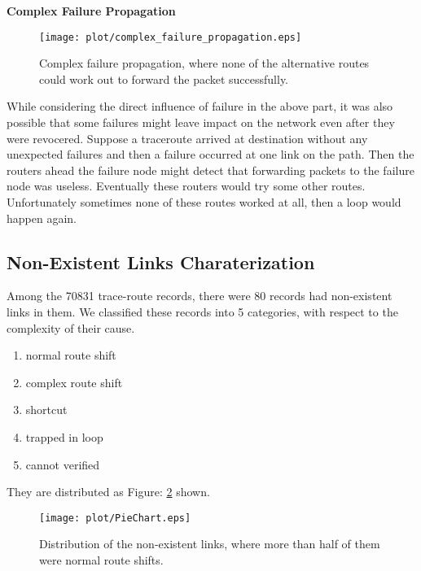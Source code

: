 \documentclass[conference, twocolumn, oneside, 10pt]{IEEEtran}
\begin{document}
\textbf{Complex Failure Propagation}

\begin{figure}[h!]
\centering
\texttt{[image: plot/complex\_failure\_propagation.eps]}
\caption{Complex failure propagation, where none of the alternative routes could work out to forward the packet successfully.}
\label{fig:asdf4}
\end{figure}

While considering the direct influence of failure in the above part, it was also possible that some failures might leave impact on the network even after they were revocered. Suppose a traceroute arrived at destination without any unexpected failures and then a failure occurred at one link on the path. Then the routers ahead the failure node might detect that forwarding packets to the failure node was useless. Eventually these routers would try some other routes. Unfortunately sometimes none of these routes worked at all, then a loop would happen again.

\subsection{Non-Existent Links Charaterization}

Among the 70831 trace-route records, there were 80 records had non-existent links in them. We classified these records into 5 categories, with respect to the complexity of their cause.

\begin{enumerate}

\item{normal route shift}

\item{complex route shift}

\item{shortcut}

\item{trapped in loop}

\item{cannot verified}

\end{enumerate}

They are distributed as Figure: \ref{fig:PieChart} shown.

\begin{figure}[h!]
  \centering
  \texttt{[image: plot/PieChart.eps]}
  \caption{Distribution of the non-existent links, where more than half of them were normal route shifts.}
  \label{fig:PieChart}
\end{figure}
\end{document}
